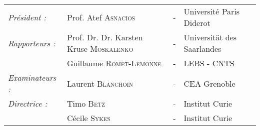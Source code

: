 \begin{center}
\begin{minipage}{0.75\linewidth}
\begin{center}
            \end{center}
            \begin{center}
            \noindent \large 
            \begin{tabular}{llcl}
                \textit{Président :}	& Prof. Atef \textsc{Asnacios }& - & Université Paris Diderot \\
                \textit{Rapporteurs :}	& Prof. Dr. Dr. Karsten Kruse \textsc{Moskalenko}& - & Universität des Saarlandes \\
                            & Guillaume \textsc{Romet-Lemonne}	& - & LEBS - CNTS\\
                            
                \textit{Examinateurs :}	& Laurent \textsc{Blanchoin}& - & CEA Grenoble\\
                \textit{Directrice :}   & Timo \textsc{Betz}		& - & Institut Curie\\
                                        & Cécile \textsc{Sykes}		& - & Institut Curie\\
                            
            \end{tabular}
            \end{center}
        \end{minipage}
    \end{center}
    \newpage
